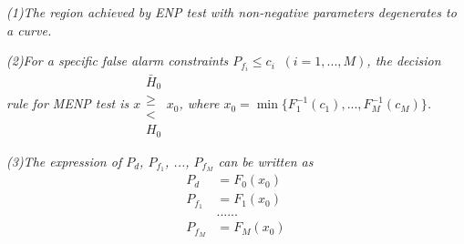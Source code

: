   \textit{(1)The region achieved by ENP test with non-negative parameters degenerates to a curve.}

  \textit{(2)For a specific false alarm constraints $P_{f_i} \leq c_i\;\;(i = 1, ..., M)$, the decision rule for MENP test is $x \substack{\bar{H}_0 \\ \geq \\ < \\H_0} x_0$, where $x_0 = \min\{F_1^{-1}(c_1), ..., F_M^{-1}(c_M)\}$.}

  \textit{(3)The expression of $P_d$, $P_{f_1}$, ..., $P_{f_M}$ can be written as}
  \begin{equation}
	\label{equ: chi pd}
	\begin{split}
	  P_d & = F_0(x_0)\\
	  P_{f_1} & = F_1(x_0)\\
	  &......\\
	  P_{f_M} & = F_M(x_0)
	\end{split}
  \end{equation}


